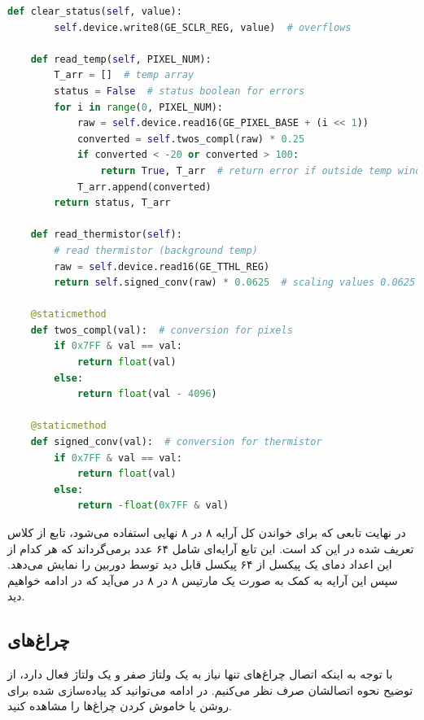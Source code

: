 \begin{latin}
\begin{lstlisting}[language=python]
    def clear_status(self, value):
        self.device.write8(GE_SCLR_REG, value)  # overflows

    def read_temp(self, PIXEL_NUM):
        T_arr = []  # temp array
        status = False  # status boolean for errors
        for i in range(0, PIXEL_NUM):
            raw = self.device.read16(GE_PIXEL_BASE + (i << 1))
            converted = self.twos_compl(raw) * 0.25
            if converted < -20 or converted > 100:
                return True, T_arr  # return error if outside temp window
            T_arr.append(converted)
        return status, T_arr

    def read_thermistor(self):
        # read thermistor (background temp)
        raw = self.device.read16(GE_TTHL_REG)
        return self.signed_conv(raw) * 0.0625  # scaling values 0.0625

    @staticmethod
    def twos_compl(val):  # conversion for pixels
        if 0x7FF & val == val:
            return float(val)
        else:
            return float(val - 4096)

    @staticmethod
    def signed_conv(val):  # conversion for thermistor
        if 0x7FF & val == val:
            return float(val)
        else:
            return -float(0x7FF & val)

\end{lstlisting}
\end{latin}

در نهایت تابعی که برای خواندن کل آرایه ۸ در ۸ نهایی استفاده می‌شود، تابع  از کلاس تعریف شده در این کد است. این تابع آرایه‌ای شامل ۶۴ عدد  برمی‌گرداند که هر کدام از این اعداد دمای یک پیکسل از ۶۴ پیکسل قابل دید توسط دوربین را نمایش می‌دهد. سپس این آرایه به کمک  به صورت یک مارتیس ۸ در ۸ در می‌آید که در ادامه خواهیم دید.


\subsection{چراغ‌های }
با توجه به اینکه اتصال چراغ‌های  تنها نیاز به یک ولتاژ صفر و یک ولتاژ فعال دارد، از توضیح نحوه اتصالشان صرف نظر می‌کنیم. در ادامه‌ می‌توانید کد پیاده‌سازی شده برای روشن یا خاموش کردن چراغ‌ها را مشاهده کنید.

